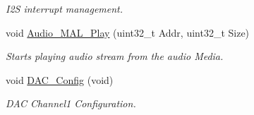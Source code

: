 \begin{DoxyCompactItemize}
\begin{DoxyCompactList}\small\item\em I2\-S interrupt management. \end{DoxyCompactList}\item 
void \hyperlink{group___s_t_m32_f4___d_i_s_c_o_v_e_r_y___a_u_d_i_o___c_o_d_e_c___private___functions_ga61e4aae22494a20a40ca16f66d0663a0}{Audio\-\_\-\-M\-A\-L\-\_\-\-Play} (uint32\-\_\-t Addr, uint32\-\_\-t Size)
\begin{DoxyCompactList}\small\item\em Starts playing audio stream from the audio Media. \end{DoxyCompactList}\item 
void \hyperlink{group___s_t_m32_f4___d_i_s_c_o_v_e_r_y___a_u_d_i_o___c_o_d_e_c___private___functions_ga1c4fcf5b7727573c3b30e5b95e61cdcc}{D\-A\-C\-\_\-\-Config} (void)
\begin{DoxyCompactList}\small\item\em D\-A\-C Channel1 Configuration. \end{DoxyCompactList}\end{DoxyCompactItemize}
